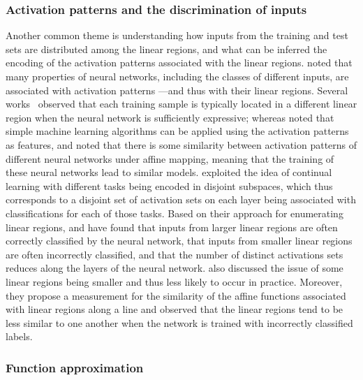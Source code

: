 \subsubsection{Activation patterns and the discrimination of inputs}

Another common theme is understanding how inputs from the training and test sets are distributed among the linear regions, and what can be inferred the encoding of the activation patterns associated with the linear regions.
%
\cite{gopinath2019property} noted that many properties of neural networks, including the classes of different inputs, are associated with activation patterns ---and thus with their linear regions. 
Several works~\citep{HashEncoders,sattelberg2020locally,tropex2021iclr} observed that each training sample is typically located in a different linear region when the neural network is sufficiently expressive; whereas
\cite{HashEncoders} noted that simple machine learning algorithms can be applied using the activation patterns as features, and 
\cite{sattelberg2020locally} noted that there is some similarity between activation patterns of different neural networks under affine mapping, meaning that the training of these neural networks lead to similar models.
\cite{chaudhry2020continual} exploited the idea of continual learning with different tasks being encoded in disjoint subspaces, 
which thus corresponds to a disjoint set of activation sets on each layer being associated with classifications for each of those tasks. 
Based on their approach for enumerating linear regions, 
\cite{craighero2020compositional} and \cite{craighero2020understanding} have found that inputs from larger linear regions are often correctly classified by the neural network, that inputs from smaller linear regions are often incorrectly classified, and that the number of distinct activations sets reduces along the layers of the neural network. 
\cite{gamba2022equal} also discussed the issue of some linear regions being smaller and thus less likely to occur in practice. 
Moreover, they propose a measurement for the similarity of the affine functions associated with linear regions along a line 
and observed that the linear regions tend to be less similar to one another when the network is trained with incorrectly classified labels. 

 
\subsubsection{Function approximation}

